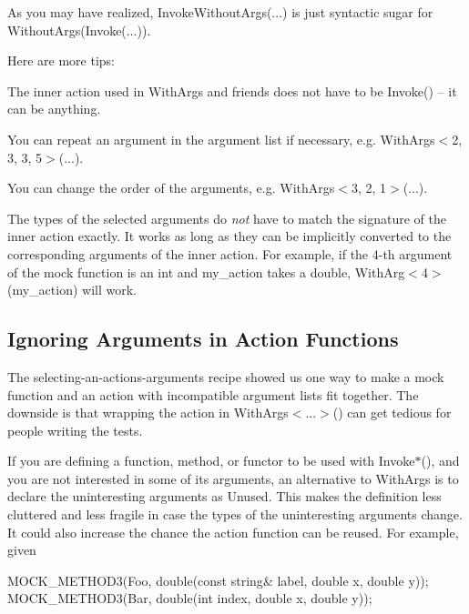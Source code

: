 As you may have realized, {\ttfamily Invoke\+Without\+Args(...)} is just syntactic sugar for {\ttfamily Without\+Args(Invoke(...))}.

Here are more tips\+:


\begin{DoxyItemize}
\item The inner action used in {\ttfamily With\+Args} and friends does not have to be {\ttfamily Invoke()} -- it can be anything.
\item You can repeat an argument in the argument list if necessary, e.\+g. {\ttfamily With\+Args$<$2, 3, 3, 5$>$(...)}.
\item You can change the order of the arguments, e.\+g. {\ttfamily With\+Args$<$3, 2, 1$>$(...)}.
\item The types of the selected arguments do {\itshape not} have to match the signature of the inner action exactly. It works as long as they can be implicitly converted to the corresponding arguments of the inner action. For example, if the 4-\/th argument of the mock function is an {\ttfamily int} and {\ttfamily my\+\_\+action} takes a {\ttfamily double}, {\ttfamily With\+Arg$<$4$>$(my\+\_\+action)} will work.
\end{DoxyItemize}

\subsection*{Ignoring Arguments in Action Functions}

The selecting-\/an-\/action\textquotesingle{}s-\/arguments recipe showed us one way to make a mock function and an action with incompatible argument lists fit together. The downside is that wrapping the action in {\ttfamily With\+Args$<$...$>$()} can get tedious for people writing the tests.

If you are defining a function, method, or functor to be used with {\ttfamily Invoke$\ast$()}, and you are not interested in some of its arguments, an alternative to {\ttfamily With\+Args} is to declare the uninteresting arguments as {\ttfamily Unused}. This makes the definition less cluttered and less fragile in case the types of the uninteresting arguments change. It could also increase the chance the action function can be reused. For example, given


\begin{DoxyCode}
MOCK\_METHOD3(Foo, \textcolor{keywordtype}{double}(\textcolor{keyword}{const} \textcolor{keywordtype}{string}& label, \textcolor{keywordtype}{double} x, \textcolor{keywordtype}{double} y));
MOCK\_METHOD3(Bar, \textcolor{keywordtype}{double}(\textcolor{keywordtype}{int} index, \textcolor{keywordtype}{double} x, \textcolor{keywordtype}{double} y));
\end{DoxyCode}


